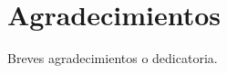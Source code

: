\documentclass[12pt,twoside,titlepage]{report}
\newcommand{\nombreautor}{Oscar Nydza Nicpoñ}
\newcommand{\nombretutor}{Juan Manuel Serrano Hidalgo}
\newcommand{\titulotrabajo}{Comparativa entre las API de Spark en Scala y Python}
\newcommand{\escuelalargo}{Escuela Técnica Superior de Ingeniería Informática}
\newcommand{\universidad}{Universidad Rey Juan Carlos}
\newcommand{\fecha}{Fecha}
\newcommand\blankpage{%
    \newpage
    \null
    \thispagestyle{empty}%
    \newpage}
\begin{document}








\hypersetup{pageanchor=true}

\normalsize
\afterpage{\blankpage} %






\setlength{\parskip}{0.75em}
\renewcommand{\baselinestretch}{1.25}

\setcounter{page}{2}



\chapter*{Agradecimientos}

Breves agradecimientos o dedicatoria.

\afterpage{\blankpage}
\end{document}
